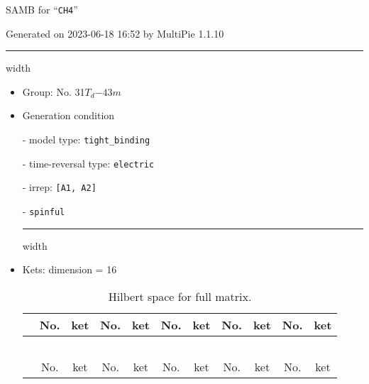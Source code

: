 \documentclass[fleqn,10pt,landscape]{article}
\begin{document}
\setcounter{MaxMatrixCols}{16}

\setlength{\baselineskip}{16pt}
\footnotesize
\begin{center}
\LARGE
SAMB for ``\texttt{CH4}''
\end{center}
\begin{flushright}
Generated on 2023-06-18 16:52 by MultiPie 1.1.10
\end{flushright}
\vspace{1cm}


 \hfil \hrule height 1mm width \textwidth \hfil

\begin{itemize}
\item Group: No. 31\quad$T_{d}$\quad$-43m$\quad[ cubic ]

\vspace{5mm}

\item Generation condition

\quad - model type: \texttt{tight_binding}

\quad - time-reversal type: \texttt{electric}

\quad - irrep: \texttt{[A1, A2]}

\quad - \texttt{spinful}


 \hfil \hrule height 1mm width \textwidth \hfil

\item Kets: dimension = 16
\begin{center}
\renewcommand{\arraystretch}{1.3}
\begin{longtable}{c|cc|cc|cc|cc|cc}
\caption{Hilbert space for full matrix.}
 \\
 \hline \hline
 & No. & ket & No. & ket & No. & ket & No. & ket & No. & ket \\ \hline \endfirsthead

\multicolumn{10}{l}{\tablename\ \thetable{}} \\
 \hline \hline
 & No. & ket & No. & ket & No. & ket & No. & ket & No. & ket \\ \hline \endhead


\end{longtable}
\end{center}
\end{itemize}
\end{document}
